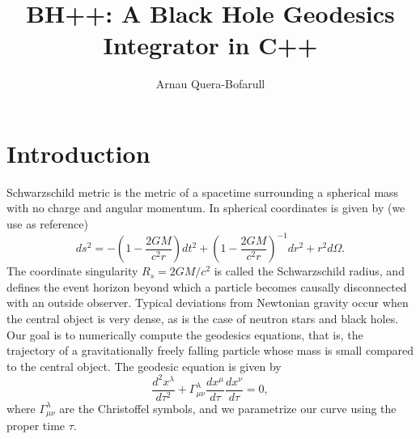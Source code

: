 \documentclass[journal, a4paper]{IEEEtran}
\begin{document}
	\title{ BH++: A Black Hole Geodesics Integrator in C++}
	\author{Arnau Quera-Bofarull}	
	\maketitle

\section{Introduction}
 Schwarzschild metric is the metric of a spacetime surrounding a spherical mass with no charge and angular momentum. In spherical coordinates is given by (we use \cite{WALD} as reference)
	\begin{equation}
		ds^2 = - \left( 1 - \frac{2GM}{c^2 r} \right) dt^2 + \left( 1- \frac{2GM}{c^2 r} \right)^{-1} dr^2 + r^2 d\Omega.
	\end{equation}
The coordinate singularity $R_s = 2GM/c^2$ is called the Schwarzschild radius, and defines the event horizon beyond which a particle becomes causally disconnected with an outside observer. Typical deviations from Newtonian gravity occur when the central object is very dense, as is the case of neutron stars and black holes. Our goal is to numerically compute the geodesics equations, that is, the trajectory of a gravitationally freely falling particle whose mass is small compared to the central object. The geodesic equation is given by
\begin{equation}
	\frac{d^2 x^\lambda}{d \tau^2} + \Gamma_{ \mu \nu }^{ \lambda} \frac{d x^{\mu}}{d \tau} \frac{d x^{\nu}}{d \tau} = 0,
\end{equation}
where $\Gamma_{ \mu \nu }^{ \lambda}$ are the Christoffel symbols, and we parametrize our curve using the proper time $ \tau $.
\end{document}
